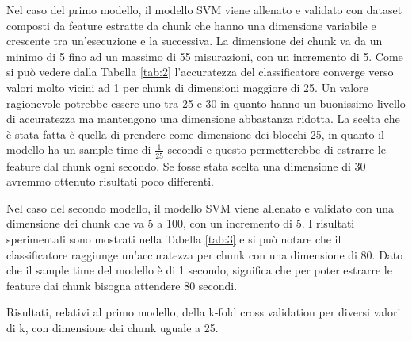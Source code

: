 \documentclass[Lau,binding=0.6cm,noexaminfo]{sapthesis}
\begin{document}
Nel caso del primo modello, il modello SVM viene allenato e validato con dataset composti da feature estratte da chunk che hanno una dimensione variabile e crescente tra un'esecuzione e la successiva. La dimensione dei chunk va da un minimo di 5 fino ad un massimo di 55 misurazioni, con un incremento di 5.
Come si pu\`o vedere dalla Tabella \ref{tab:2} l'accuratezza del classificatore converge verso valori molto vicini ad 1 per chunk di dimensioni maggiore di 25.
Un valore ragionevole potrebbe essere uno tra 25 e 30 in quanto hanno un buonissimo livello di accuratezza ma mantengono una dimensione abbastanza ridotta.
La scelta che \`e stata fatta \`e quella di prendere come dimensione dei blocchi 25, in quanto il modello ha un sample time di $\frac{1}{25}$ secondi e questo permetterebbe di estrarre le feature dal chunk ogni secondo.
Se fosse stata scelta una dimensione di 30 avremmo ottenuto risultati poco differenti.

Nel caso del secondo modello, il modello SVM viene allenato e validato con una dimensione dei chunk che va 5 a 100, con un incremento di 5.
I risultati sperimentali sono mostrati nella Tabella \ref{tab:3} e si pu\`o notare che il classificatore raggiunge un'accuratezza per chunk con una dimensione di 80.
Dato che il sample time del modello \`e di 1 secondo, significa che per poter estrarre le feature dai chunk bisogna attendere 80 secondi.

\begin{table}[t]
    \begin{center}
    \end{center}   
    \caption{Risultati, relativi al primo modello, della k-fold cross validation per diversi valori di k, con dimensione dei chunk uguale a 25.} 
    \label{tab:4}
    \begin{center}
    \end{center}
    \caption{Risultati, relativi al secondo modello, della k-fold cross validation per diversi valori di k, con dimensione dei chunk uguale a 80.}
    \label{tab:5}
\end{table}
\end{document}
